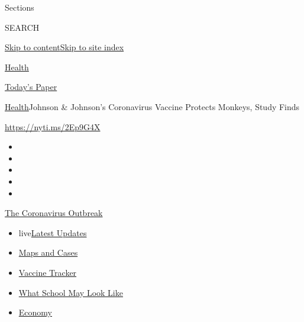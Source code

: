 Sections

SEARCH

\protect\hyperlink{site-content}{Skip to
content}\protect\hyperlink{site-index}{Skip to site index}

\href{https://www.nytimes.com/section/health}{Health}

\href{https://myaccount.nytimes.com/auth/login?response_type=cookie\&client_id=vi}{}

\href{https://www.nytimes.com/section/todayspaper}{Today's Paper}

\href{/section/health}{Health}\textbar{}Johnson \& Johnson's Coronavirus
Vaccine Protects Monkeys, Study Finds

\url{https://nyti.ms/2Ep9G4X}

\begin{itemize}
\item
\item
\item
\item
\item
\end{itemize}

\href{https://www.nytimes.com/news-event/coronavirus?action=click\&pgtype=Article\&state=default\&region=TOP_BANNER\&context=storylines_menu}{The
Coronavirus Outbreak}

\begin{itemize}
\tightlist
\item
  live\href{https://www.nytimes.com/2020/08/01/world/coronavirus-covid-19.html?action=click\&pgtype=Article\&state=default\&region=TOP_BANNER\&context=storylines_menu}{Latest
  Updates}
\item
  \href{https://www.nytimes.com/interactive/2020/us/coronavirus-us-cases.html?action=click\&pgtype=Article\&state=default\&region=TOP_BANNER\&context=storylines_menu}{Maps
  and Cases}
\item
  \href{https://www.nytimes.com/interactive/2020/science/coronavirus-vaccine-tracker.html?action=click\&pgtype=Article\&state=default\&region=TOP_BANNER\&context=storylines_menu}{Vaccine
  Tracker}
\item
  \href{https://www.nytimes.com/interactive/2020/07/29/us/schools-reopening-coronavirus.html?action=click\&pgtype=Article\&state=default\&region=TOP_BANNER\&context=storylines_menu}{What
  School May Look Like}
\item
  \href{https://www.nytimes.com/live/2020/07/31/business/stock-market-today-coronavirus?action=click\&pgtype=Article\&state=default\&region=TOP_BANNER\&context=storylines_menu}{Economy}
\end{itemize}


